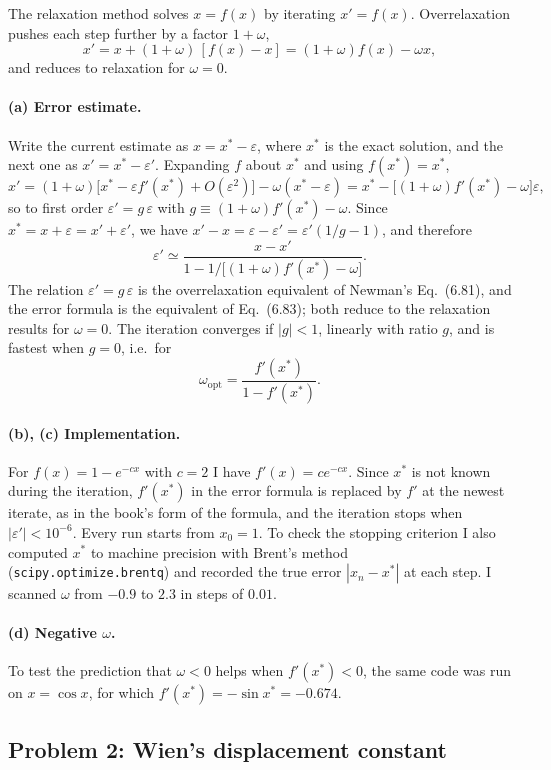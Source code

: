 \documentclass[11pt]{article}
\newcommand{\eps}{\varepsilon}
\newcommand{\code}[1]{\texttt{#1}}
\begin{document}
The relaxation method solves $x = f(x)$ by iterating $x' = f(x)$. Overrelaxation
pushes each step further by a factor $1+\omega$,
\[
x' = x + (1+\omega)\,[f(x)-x] = (1+\omega)f(x) - \omega x ,
\]
and reduces to relaxation for $\omega=0$.

\paragraph{(a) Error estimate.}
Write the current estimate as $x = x^*-\eps$, where $x^*$ is the exact solution,
and the next one as $x' = x^*-\eps'$. Expanding $f$ about $x^*$ and using
$f(x^*) = x^*$,
\[
x' = (1+\omega)\big[x^* - \eps f'(x^*) + O(\eps^2)\big] - \omega(x^*-\eps)
   = x^* - \big[(1+\omega)f'(x^*)-\omega\big]\eps ,
\]
so to first order $\eps' = g\,\eps$ with $g \equiv (1+\omega)f'(x^*)-\omega$.
Since $x^* = x+\eps = x'+\eps'$, we have $x'-x = \eps-\eps' = \eps'(1/g - 1)$, and
therefore
\[
\eps' \simeq \frac{x-x'}{1-1/\big[(1+\omega)f'(x^*)-\omega\big]} .
\]
The relation $\eps' = g\,\eps$ is the overrelaxation equivalent of Newman's
Eq.~(6.81), and the error formula is the equivalent of Eq.~(6.83); both reduce
to the relaxation results for $\omega=0$. The iteration
converges if $|g|<1$, linearly with ratio $g$, and is fastest when $g = 0$, i.e.\
for
\[
\omega_{\mathrm{opt}} = \frac{f'(x^*)}{1-f'(x^*)} .
\]

\paragraph{(b), (c) Implementation.}
For $f(x) = 1-e^{-cx}$ with $c=2$ I have $f'(x) = ce^{-cx}$. Since $x^*$ is not
known during the iteration, $f'(x^*)$ in the error formula is replaced by $f'$ at
the newest iterate, as in the book's form of the formula, and the iteration stops when $|\eps'|<10^{-6}$. Every run
starts from $x_0=1$. To check the stopping criterion I also computed $x^*$ to
machine precision with Brent's method (\code{scipy.optimize.brentq}) and
recorded the true error $|x_n-x^*|$ at each step. I scanned $\omega$ from $-0.9$
to $2.3$ in steps of $0.01$.

\paragraph{(d) Negative $\omega$.}
To test the prediction that $\omega<0$ helps when $f'(x^*)<0$, the same code was
run on $x = \cos x$, for which $f'(x^*) = -\sin x^* = -0.674$.

\subsection*{Problem 2: Wien's displacement constant}
\end{document}
